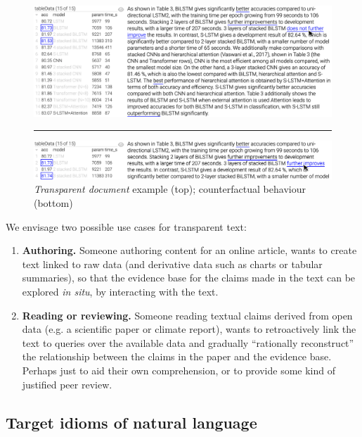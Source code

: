 \begin{figure}%
    \centering
    \includegraphics[width=\linewidth]{fig/scigen-1805.02474v1-10-with-pointer.png}
    \vspace{1mm}
    \hrule
    \includegraphics[width=\linewidth]{fig/scigen-1805.02474v1-10-counterfactual-with-pointer.png}
    \caption{\emph{Transparent document} example (top); counterfactual behaviour (bottom)}\label{fig:scigen-example-website}
\end{figure}

We envisage two possible use cases for transparent text:

\begin{enumerate}
\item \textbf{Authoring.} Someone authoring content for an online article, wants to create text
linked to raw data (and derivative data such as charts or tabular summaries), so that the evidence base for
the claims made in the text can be explored \emph{in situ}, by interacting with the text.

\item \textbf{Reading or reviewing.} Someone reading textual claims derived from open data (e.g. a
scientific paper or climate report), wants to retroactively link the text to queries over the available data
and gradually ``rationally reconstruct'' the relationship between the claims in the paper and the evidence
base. Perhaps just to aid their own comprehension, or to provide some kind of justified peer review.
\end{enumerate}



\subsection{Target idioms of natural language}

